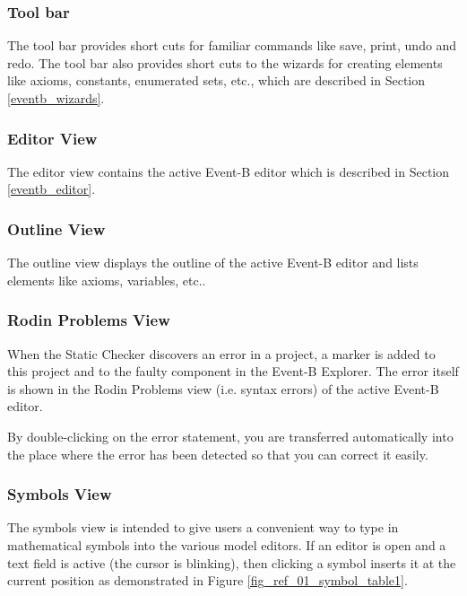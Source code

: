 \subsubsection{Tool bar}
\label{tool_bar}

The tool bar provides short cuts for familiar commands like save, print, undo and redo. The tool bar also provides short cuts to the wizards for creating elements like axioms, constants, enumerated sets, etc., which are described in Section \ref{eventb_wizards}.

\subsubsection{Editor View}
\label{editor_view}

The editor view contains the active Event-B editor which is described in Section \ref{eventb_editor}.

\subsubsection{Outline View}
\label{outline_view}

The outline view displays the outline of the active Event-B editor and lists elements like axioms, variables, etc.. 

\subsubsection{Rodin Problems View}
\label{rodin_problems_view}

When the Static Checker discovers an error in a project, a  marker is added to this project and to the faulty component in the \textsf{Event-B Explorer}. The error itself is shown in the Rodin Problems view (i.e. syntax errors) of the active Event-B editor.

By double-clicking on the error statement, you are transferred automatically into the place where the error has been detected so that you can correct it easily.

\subsubsection{Symbols View}
\label{symbols_view}

The symbols view is intended to give users a convenient way to type in mathematical symbols into the various model editors. If an editor is open and a text field is active (the cursor is blinking), then clicking a symbol inserts it at the current position as demonstrated in Figure \ref{fig_ref_01_symbol_table1}. 

